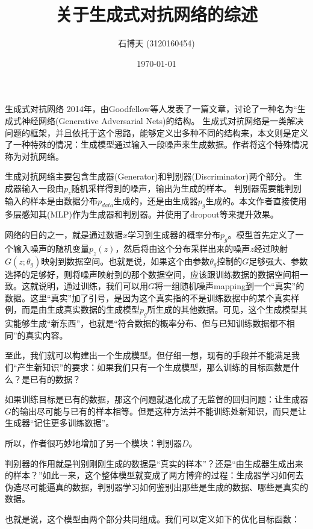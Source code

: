 \documentclass{ctexart}
\begin{document}
	\title{关于生成式对抗网络的综述}
	\author{石博天 (3120160454)}
	\date{\today}
	
	\maketitle
	\begin{section}{生成式对抗网络}
		2014年，由Goodfellow等人发表了一篇文章\cite{goodfellow2014generative}，讨论了一种名为“生成式神经网络(Generative Adversarial Nets)的结构。
		生成式对抗网络是一类解决问题的框架，并且依托于这个思路，能够定义出多种不同的结构来，本文则是定义了一种特殊的情况：生成模型通过输入一段噪声来生成数据。作者将这个特殊情况称为对抗网络。
		
		生成对抗网络主要包含生成器(Generator)和判别器(Discriminator)两个部分。 生成器输入一段由$p_z$随机采样得到的噪声，输出为生成的样本。 判别器需要能判别输入的样本是由数据分布$p_{data}$生成的，还是由生成器$p_g$生成的。本文作者直接使用多层感知其(MLP)作为生成器和判别器。并使用了dropout等来提升效果。
		
		网络的目的之一，就是通过数据$x$学习到生成器的概率分布$p_g$。模型首先定义了一个输入噪声的随机变量$p_z(z)$，然后将由这个分布采样出来的噪声$z$经过映射$G(z;\theta_g)$映射到数据空间。也就是说，如果这个由参数$\theta_g$控制的$G$足够强大、参数选择的足够好，则将噪声映射到的那个数据空间，应该跟训练数据的数据空间相一致。这就说明，通过训练，我们可以用$G$将一组随机噪声mapping到一个“真实”的数据。这里“真实”加了引号，是因为这个真实指的不是训练数据中的某个真实样例，而是由生成真实数据的生成模型$p_g$所生成的其他数据。可见，这个生成模型其实能够生成“新东西”，也就是“符合数据的概率分布、但与已知训练数据都不相同”的真实内容。
		
		至此，我们就可以构建出一个生成模型。但仔细一想，现有的手段并不能满足我们“产生新知识”的要求：如果我们只有一个生成模型，那么训练的目标函数是什么？是已有的数据？
		
		如果训练目标是已有的数据，那这个问题就退化成了无监督的回归问题：让生成器$G$的输出尽可能与已有的样本相等。但是这种方法并不能训练处新知识，而只是让生成器“记住更多训练数据”。
		
		所以，作者很巧妙地增加了另一个模块：判别器$D$。
		
		判别器的作用就是判别刚刚生成的数据是“真实的样本”？还是“由生成器生成出来的样本？”如此一来，这个整体模型就变成了两方博弈的过程：生成器学习如何去伪造尽可能逼真的数据，判别器学习如何鉴别出那些是生成的数据、哪些是真实的数据。
		
		也就是说，这个模型由两个部分共同组成。我们可以定义如下的优化目标函数：
		

\end{section}
\end{document}
